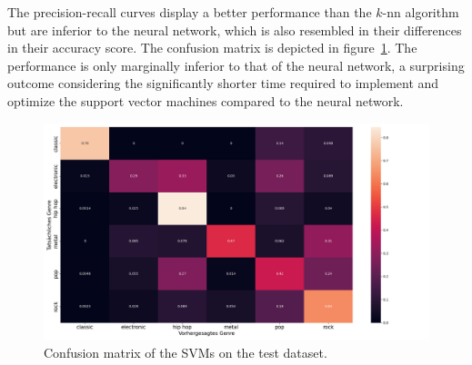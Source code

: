 \documentclass[
  12pt,
  bibliography=totoc,     %
  captions=tableheading,  %
  titlepage=firstiscover, %
]{scrartcl}
\begin{document}
\noindent
The precision-recall curves display a better performance than the $k$-nn algorithm but are inferior to the neural network, which is also resembled in their differences
in their accuracy score. The confusion matrix is depicted in figure~\ref{fig:conf_svm}.
The performance is only marginally inferior to that of the neural network, a surprising outcome considering the significantly shorter time required to implement and optimize
the support vector machines compared to the neural network.
\begin{figure}[H]
  \centering
  \includegraphics[scale=0.29]{figures/svm/confusion_matrix_svm.png}
  \caption{Confusion matrix of the SVMs on the test dataset.}
  \label{fig:conf_svm}
\end{figure}
\noindent
\end{document}
